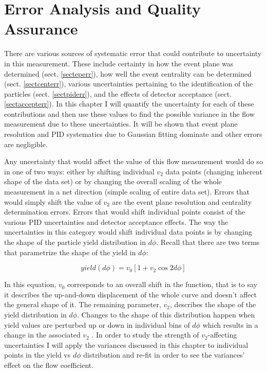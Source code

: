 
\chapter{Error Analysis and Quality Assurance} %
There are various sources of systematic error that could contribute to uncertainty in this measurement. These include certainty in how the event plane was determined (sect. \ref{secteperr}), how well the event centrality can be determined (sect. \ref{sectcenterr}), various uncertainties pertaining to the identification of the particles (sect. \ref{sectpiderr}), and the effects of detector acceptance (sect. \ref{sectaccepterr}). In this chapter I will quantify the uncertainty for each of these contributions and then use these values to find the possible variance in the flow measurement due to these uncertainties. It will be shown that event plane resolution and PID systematics due to Gaussian fitting dominate and other errors are negligible.

Any uncertainty that would affect the value of this flow measurement would do so in one of two ways: either by shifting individual $v_2$ data points (changing inherent shape of the data set) or by changing the overall scaling of the whole measurement in a net direction (simple scaling of entire data set). Errors that would simply shift the value of $v_2$ are the event plane resolution and centrality determination errors. Errors that would shift individual points consist of the various PID uncertainties and detector acceptance effects. The way the uncertainties in this category would shift individual data points is by changing the shape of the particle yield distribution in $d\phi$. Recall that there are two terms that parametrize the shape of the yield in $d\phi$:

\begin{equation}
yield(d\phi) = v_0 [1 + v_2 \cos 2d\phi]
\end{equation}

In this equation, $v_0$ corresponds to an overall shift in the function, that is to say it describes the up-and-down displacement of the whole curve and doesn't affect the general shape of it. The remaining parameter, $v_2$, describes the shape of the yield distribution in $d\phi$. Changes to the shape of this distribution happen when yield values are perturbed up or down in individual bins of $d\phi$ which results in a change in the associated $v_2$ . In order to study the strength of $v_2$-affecting uncertainties I will apply the variances discussed in this chapter to individual points in the yield vs $d\phi$ distribution and re-fit in order to see the variances' effect on the flow coefficient. 

